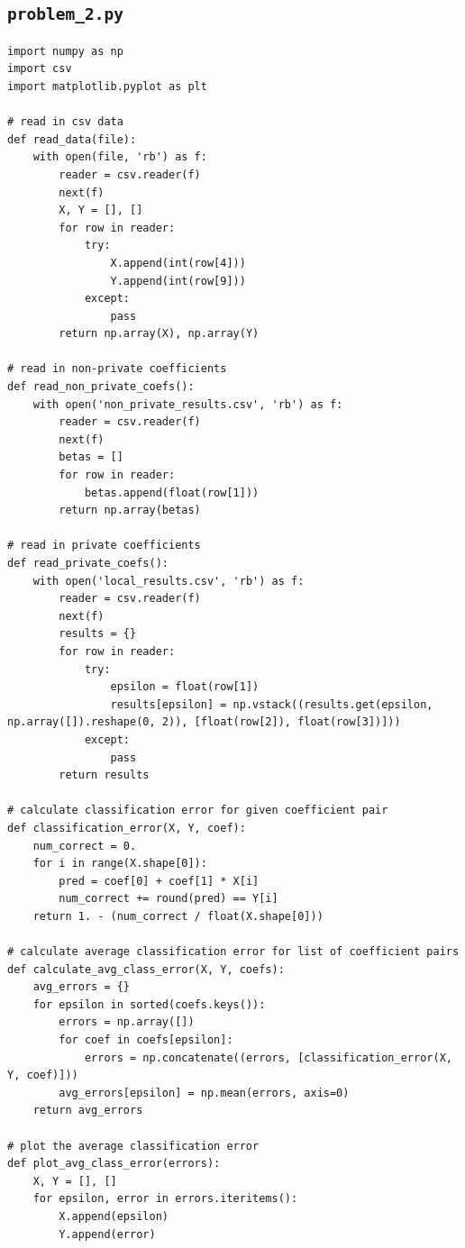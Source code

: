 \documentclass[12pt]{article}
\def\cl{\lstinline}
\begin{document}
\begin{appendices}

\section{\cl{problem_2.py}}
\label{appendix:problem_2}

\begin{lstlisting}
import numpy as np
import csv
import matplotlib.pyplot as plt

# read in csv data
def read_data(file):
    with open(file, 'rb') as f:
        reader = csv.reader(f)
        next(f)
        X, Y = [], []
        for row in reader:
            try:
                X.append(int(row[4]))
                Y.append(int(row[9]))
            except:
                pass
        return np.array(X), np.array(Y)

# read in non-private coefficients
def read_non_private_coefs():
    with open('non_private_results.csv', 'rb') as f:
        reader = csv.reader(f)
        next(f)
        betas = []
        for row in reader:
            betas.append(float(row[1]))
        return np.array(betas)

# read in private coefficients
def read_private_coefs():
    with open('local_results.csv', 'rb') as f:
        reader = csv.reader(f)
        next(f)
        results = {}
        for row in reader:
            try:
                epsilon = float(row[1])
                results[epsilon] = np.vstack((results.get(epsilon, np.array([]).reshape(0, 2)), [float(row[2]), float(row[3])]))
            except:
                pass
        return results

# calculate classification error for given coefficient pair
def classification_error(X, Y, coef):
    num_correct = 0.
    for i in range(X.shape[0]):
        pred = coef[0] + coef[1] * X[i]
        num_correct += round(pred) == Y[i]
    return 1. - (num_correct / float(X.shape[0]))

# calculate average classification error for list of coefficient pairs
def calculate_avg_class_error(X, Y, coefs):
    avg_errors = {}
    for epsilon in sorted(coefs.keys()):
        errors = np.array([])
        for coef in coefs[epsilon]:
            errors = np.concatenate((errors, [classification_error(X, Y, coef)]))
        avg_errors[epsilon] = np.mean(errors, axis=0)
    return avg_errors

# plot the average classification error
def plot_avg_class_error(errors):
    X, Y = [], []
    for epsilon, error in errors.iteritems():
        X.append(epsilon)
        Y.append(error)


\end{lstlisting}
\end{appendices}
\end{document}
